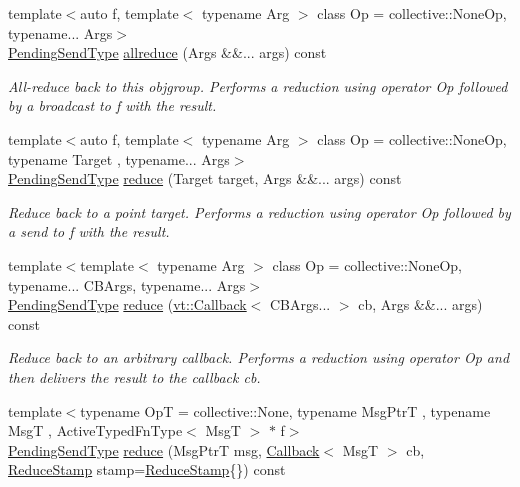 \begin{DoxyCompactItemize}
{\footnotesize template$<$auto f, template$<$ typename Arg $>$ class Op = collective\+::\+None\+Op, typename... Args$>$ }\\\hyperlink{structvt_1_1objgroup_1_1proxy_1_1_proxy_a1bdf8713203531d306702a024872bb08}{Pending\+Send\+Type} \hyperlink{structvt_1_1objgroup_1_1proxy_1_1_proxy_ab8d4b9337c19d4ff0e758d03f3941b98}{allreduce} (Args \&\&... args) const
\begin{DoxyCompactList}\small\item\em All-\/reduce back to this objgroup. Performs a reduction using operator {\ttfamily Op} followed by a broadcast to {\ttfamily f} with the result. \end{DoxyCompactList}\item 
{\footnotesize template$<$auto f, template$<$ typename Arg $>$ class Op = collective\+::\+None\+Op, typename Target , typename... Args$>$ }\\\hyperlink{structvt_1_1objgroup_1_1proxy_1_1_proxy_a1bdf8713203531d306702a024872bb08}{Pending\+Send\+Type} \hyperlink{structvt_1_1objgroup_1_1proxy_1_1_proxy_a10836524197347f63d5507f08d871e4f}{reduce} (Target target, Args \&\&... args) const
\begin{DoxyCompactList}\small\item\em Reduce back to a point target. Performs a reduction using operator {\ttfamily Op} followed by a send to {\ttfamily f} with the result. \end{DoxyCompactList}\item 
{\footnotesize template$<$template$<$ typename Arg $>$ class Op = collective\+::\+None\+Op, typename... C\+B\+Args, typename... Args$>$ }\\\hyperlink{structvt_1_1objgroup_1_1proxy_1_1_proxy_a1bdf8713203531d306702a024872bb08}{Pending\+Send\+Type} \hyperlink{structvt_1_1objgroup_1_1proxy_1_1_proxy_a96eb24e65cfda56210ca202010b7f172}{reduce} (\hyperlink{namespacevt_a57b238783d05de96bc2c4027f7073b7f}{vt\+::\+Callback}$<$ C\+B\+Args... $>$ cb, Args \&\&... args) const
\begin{DoxyCompactList}\small\item\em Reduce back to an arbitrary callback. Performs a reduction using operator {\ttfamily Op} and then delivers the result to the callback {\ttfamily cb}. \end{DoxyCompactList}\item 
{\footnotesize template$<$typename OpT  = collective\+::\+None, typename Msg\+PtrT , typename MsgT , Active\+Typed\+Fn\+Type$<$ Msg\+T $>$ $\ast$ f$>$ }\\\hyperlink{structvt_1_1objgroup_1_1proxy_1_1_proxy_a1bdf8713203531d306702a024872bb08}{Pending\+Send\+Type} \hyperlink{structvt_1_1objgroup_1_1proxy_1_1_proxy_a61273d407174fb496b4aed10ec6650bd}{reduce} (Msg\+PtrT msg, \hyperlink{namespacevt_a57b238783d05de96bc2c4027f7073b7f}{Callback}$<$ MsgT $>$ cb, \hyperlink{structvt_1_1objgroup_1_1proxy_1_1_proxy_a337be4c20cf11ff6477c7a66208cc909}{Reduce\+Stamp} stamp=\hyperlink{structvt_1_1objgroup_1_1proxy_1_1_proxy_a337be4c20cf11ff6477c7a66208cc909}{Reduce\+Stamp}\{\}) const

\end{DoxyCompactItemize}
